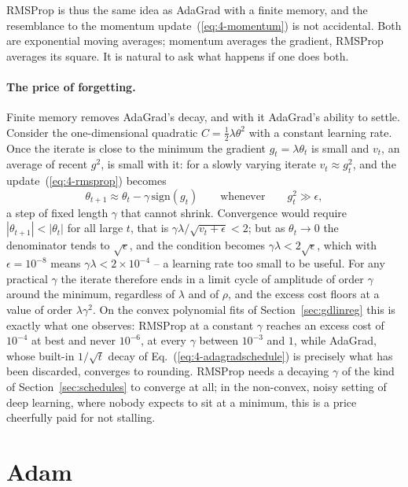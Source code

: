 RMSProp is thus the same idea as AdaGrad with a finite memory, and the
resemblance to the momentum update~(\ref{eq:4-momentum}) is not accidental.
Both are exponential moving averages; momentum averages the gradient, RMSProp
averages its square.  It is natural to ask what happens if one does both.

\paragraph{The price of forgetting.}
Finite memory removes AdaGrad's decay, and with it AdaGrad's ability to
settle.  Consider the one-dimensional quadratic $C=\frac12\lambda\theta^{2}$
with a constant learning rate.  Once the iterate is close to the minimum the
gradient $g_t=\lambda\theta_t$ is small and $v_t$, an average of recent
$g^{2}$, is small with it: for a slowly varying iterate $v_t\approx g_t^{2}$,
and the update~(\ref{eq:4-rmsprop}) becomes
\begin{equation}
  \theta_{t+1}\approx\theta_t-\gamma\,\mathrm{sign}(g_t)
  \qquad\text{whenever}\qquad g_t^{2}\gg\epsilon ,
  \label{eq:4-rmspropsign}
\end{equation}
a step of fixed length $\gamma$ that cannot shrink.  Convergence would
require $|\theta_{t+1}|<|\theta_t|$ for all large $t$, that is
$\gamma\lambda/\sqrt{v_t+\epsilon}<2$; but as $\theta_t\to0$ the
denominator tends to $\sqrt{\epsilon}$, and the condition becomes
$\gamma\lambda<2\sqrt{\epsilon}$, which with $\epsilon=10^{-8}$ means
$\gamma\lambda<2\times10^{-4}$ -- a learning rate too small to be useful.
For any practical $\gamma$ the iterate therefore ends in a limit cycle of
amplitude of order $\gamma$ around the minimum, regardless of $\lambda$ and
of $\rho$, and the excess cost floors at a value of order $\lambda\gamma^{2}$.  On the
convex polynomial fits of Section~\ref{sec:gdlinreg} this is exactly what
one observes: RMSProp at a constant $\gamma$ reaches an excess cost of
$10^{-4}$ at best and never $10^{-6}$, at every $\gamma$ between $10^{-3}$ and $1$,
while AdaGrad, whose built-in $1/\sqrt{t}$ decay of
Eq.~(\ref{eq:4-adagradschedule}) is precisely what has been discarded,
converges to rounding.  RMSProp needs a decaying $\gamma$ of the kind of
Section~\ref{sec:schedules} to converge at all; in the non-convex, noisy
setting of deep learning, where nobody expects to sit at a minimum, this is a
price cheerfully paid for not stalling.

\section{Adam}
\label{sec:adam}

